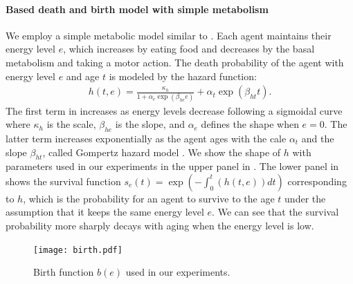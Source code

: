 \paragraph{Based death and birth model with simple metabolism}
We employ a simple metabolic model similar to \citet{hamonEcoevolutionaryDynamicsNonepisodic2023}. Each agent maintains their energy level $e$, which increases by eating food and decreases by the basal metabolism and taking a motor action.
The death probability of the agent with energy level $e$ and age $t$ is modeled by the hazard function:
\begin{align}
  h(t, e) = \frac{\kappa_{h}}{1 + \alpha_{e}\exp(\beta_{he}e)} + \alpha_{t} \exp(\beta_{ht} t).
  \label{eq:h}
\end{align}
The first term in  increases as energy levels decrease following a sigmoidal curve where $\kappa_{h}$ is the scale, $\beta_{he}$ is the slope, and $\alpha_{e}$ defines the shape when $e=0$. The latter term increases exponentially as the agent ages with the cale $\alpha_{t}$ and the slope $\beta_{ht}$, called Gompertz hazard model \citep{gompertzXXIVNatureFunction1825,kirkwoodDecipheringDeathCommentary2015}.
We show the shape of $h$ with parameters used in our experiments in the upper panel in . The lower panel in  shows the survival function $s_{e}(t) = \exp (-\int_{0}^{t}(h(t, e)) dt)$ corresponding to $h$, which is the probability for an agent to survive to the age $t$ under the assumption that it keeps the same energy level $e$. We can see that the survival probability more sharply decays with aging when the energy level is low.

\begin{figure}[t]
  \centering{}
  \texttt{[image: birth.pdf]}
  \caption{Birth function $b(e)$ used in our experiments.}\label{figure:birth}
\end{figure}

